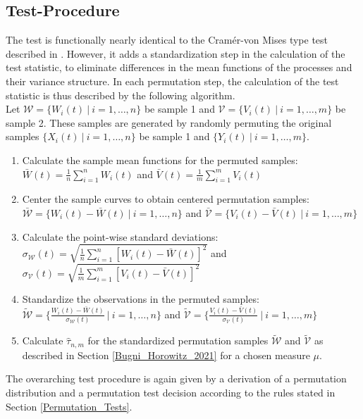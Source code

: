 \documentclass[12pt, a4paper]{article}
\theoremstyle{MAstyle} \newtheorem{assumption}{Assumption}[section]
\theoremstyle{MAstyle} \newtheorem{definition}{Definition}[section]
\theoremstyle{MAstyle} \newtheorem{theorem}{Theorem}[section]
\begin{document}
		\subsection{Test-Procedure}\label{persistence_test}
		The test is functionally nearly identical to the Cram\'{e}r-von Mises type test described in \cite{bugni_permutation_2021}. However, it adds a standardization step in the calculation of the test statistic, to eliminate differences in the mean functions of the processes and their variance structure. In each permutation step, the calculation of the test statistic is thus described by the following algorithm.\\
		
		Let $\mathcal{W} = \{W_i(t) \ | \ i = 1, \dots, n\}$ be sample 1 and $\mathcal{V} = \{V_i(t) \ | \  i = 1, \dots, m\}$ be sample 2. These samples are generated by randomly permuting the original samples $\{X_i(t) \ | \  i = 1, \dots, n\}$ be sample 1 and $\{Y_i(t) \ | \  i = 1, \dots, m\}$.
		\begin{enumerate}
			\item Calculate the sample mean functions for the permuted samples: \\
			$\bar{W}(t) = \frac{1}{n} \sum_{i = 1}^{n} W_i(t)$ and $\bar{V}(t) = \frac{1}{m} \sum_{i = 1}^{m} V_i(t)$
			\item Center the sample curves to obtain centered permutation samples: \\
			$\bar{\mathcal{W}} = \{W_i(t) - \bar{W}(t) \ | \ i = 1, \dots, n\}$ and $\bar{\mathcal{V}} = \{V_i(t) - \bar{V}(t) \ | \ i = 1, \dots, m\}$
			\item Calculate the point-wise standard deviations: \\
			$\sigma_{\mathcal{W}}(t) = \sqrt{\frac{1}{n}\sum_{i = 1}^{n}\left[W_i(t) - \bar{W}(t)\right]^2}$ and $\sigma_{\mathcal{V}}(t) = \sqrt{\frac{1}{m}\sum_{i = 1}^{m}\left[V_i(t) - \bar{V}(t)\right]^2}$
			\item Standardize the observations in the permuted samples:\\
			$\tilde{\mathcal{W}} = \{\frac{W_i(t) - \bar{W}(t)}{\sigma_{\mathcal{W}}(t)} \ | \ i = 1, \dots, n\}$ and $\tilde{\mathcal{V}} = \{ \frac{V_i(t) - \bar{V}(t)}{\sigma_{\mathcal{V}}(t)} \ | \ i = 1, \dots, m\}$
			\item Calculate $\hat{\tau}_{n,m}$ for the standardized permutation samples $\tilde{\mathcal{W}}$ and $\tilde{\mathcal{V}}$ as described in Section \ref{Bugni_Horowitz_2021} for a chosen measure $\mu$.
		\end{enumerate}
		The overarching test procedure is again given by a derivation of a permutation distribution and a permutation test decision according to the rules stated in Section \ref{Permutation_Tests}.\\
		
\end{document}

